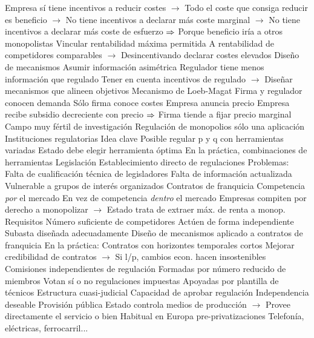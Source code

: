 \documentclass{nuevotema}
\begin{document}
\begin{esquemal}
				\4[] Empresa sí tiene incentivos a reducir costes
				\4[] $\to$ Todo el coste que consiga reducir es beneficio
				\4[] $\to$ No tiene incentivos a declarar más coste marginal
				\4[] $\to$ No tiene incentivos a declarar más coste de esfuerzo
				\4[] $\Rightarrow$ Porque beneficio iría a otros monopolistas
				\4 Vincular rentabilidad máxima permitida
				\4[] A rentabilidad de competidores comparables
				\4[] $\to$ Desincentivando declarar costes elevados
			\3 Diseño de mecanismos
				\4 Asumir información asimétrica
				\4[] Regulador tiene menos información que regulado
				\4 Tener en cuenta incentivos de regulado
				\4[] $\to$ Diseñar mecanismos que alineen objetivos
				\4 Mecanismo de Loeb-Magat
				\4[] Firma y regulador conocen demanda
				\4[] Sólo firma conoce costes
				\4[] Empresa anuncia precio
				\4[] Empresa recibe subsidio decreciente con precio
				\4[] $\Rightarrow$ Firma tiende a fijar precio marginal
				\4 Campo muy fértil de investigación
				\4[] Regulación de monopolios sólo una aplicación
		\2 Instituciones regulatorias
			\3 Idea clave
				\4 Posible regular p y q con herramientas variadas
				\4 Estado debe elegir herramienta óptima
				\4 En la práctica, combinaciones de herramientas
			\3 Legislación
				\4 Establecimiento directo de regulaciones
				\4 Problemas:
				\4[] Falta de cualificación técnica de legisladores
				\4[] Falta de información actualizada
				\4[] Vulnerable a grupos de interés organizados
			\3 Contratos de franquicia
				\4 Competencia \textit{por} el mercado
				\4[] En vez de competencia \textit{dentro} el mercado
				\4 Empresas compiten por derecho a monopolizar
				\4[] $\to$ Estado trata de extraer máx. de renta a monop.
				\4 Requisitos
				\4[] Número suficiente de competidores
				\4[] Actúen de forma independiente
				\4[] Subasta diseñada adecuadamente
				\4 Diseño de mecanismos aplicado a contratos de franquicia
				\4 En la práctica:
				\4[] Contratos con horizontes temporales cortos
				\4[] Mejorar credibilidad de contratos
				\4[] $\to$ Si l/p, cambios econ. hacen insostenibles
			\3 Comisiones independientes de regulación
				\4 Formadas por número reducido de miembros
				\4[] Votan sí o no regulaciones impuestas
				\4[] Apoyadas por plantilla de técnicos
				\4 Estructura cuasi-judicial
				\4 Capacidad de aprobar regulación
				\4 Independencia deseable
			\3 Provisión pública
				\4 Estado controla medios de producción
				\4[] $\to$ Provee directamente el servicio o bien
				\4 Habitual en Europa pre-privatizaciones
				\4[] Telefonía, eléctricas, ferrocarril...
	\1[] 

\end{esquemal}
\end{document}
